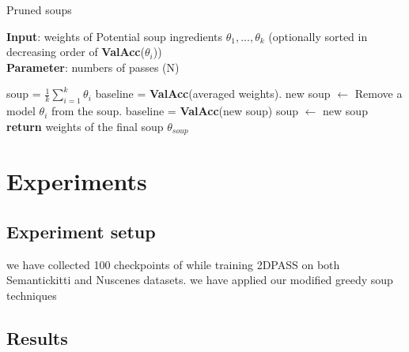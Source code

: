 \documentclass[10pt,twocolumn,letterpaper]{article}
\begin{document}
	

\begin{algorithm}[htbp]
\caption{Pruned soups}
\label{alg:algorithm}
\textbf{Input}: weights of Potential soup ingredients ${\theta_1, ..., \theta_k}$ (optionally sorted in decreasing order of \textbf{ValAcc}($\theta_i$))\\
\textbf{Parameter}: numbers of passes (N)\\
\begin{algorithmic}[1] %
\STATE soup = $\frac{1}{k} \sum_{i=1}^k \theta_i$
\STATE baseline = \textbf{ValAcc}(averaged weights).
\STATE new soup $\leftarrow$ Remove a model $\theta_i$ from the soup.
\STATE baseline = \textbf{ValAcc}(new soup)
\STATE soup $\leftarrow$ new soup
\ENDIF
\ENDFOR
\ENDFOR
\STATE \textbf{return} weights of the final soup $\theta_{soup}$
\end{algorithmic}
\end{algorithm}


\section{Experiments}
\subsection{Experiment setup}
we have collected 100 checkpoints of while training 2DPASS on both  Semantickitti and Nuscenes datasets.
we have applied our modified greedy soup techniques 

\subsection{Results}
\end{document}

